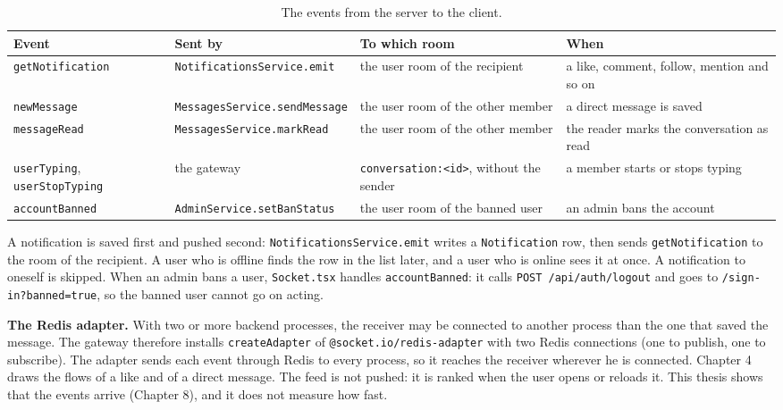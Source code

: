 \begin{table}[htb]
  \centering
  \caption{The events from the server to the client.}
  \label{tab:impl-events}
  \footnotesize
  \renewcommand{\arraystretch}{1.15}
  \begin{tabularx}{\textwidth}{@{}>{\raggedright\arraybackslash}p{3.1cm} >{\raggedright\arraybackslash}p{4.1cm} >{\raggedright\arraybackslash}p{3.4cm} >{\raggedright\arraybackslash}X@{}}
    \toprule
    Event & Sent by & To which room & When \\
    \midrule
    \texttt{getNotification} & \texttt{Notifications\allowbreak Service.emit} & the user room of the recipient & a like, comment, follow, mention and so on \\
    \texttt{newMessage} & \texttt{Messages\allowbreak Service.sendMessage} & the user room of the other member & a direct message is saved \\
    \texttt{messageRead} & \texttt{Messages\allowbreak Service.markRead} & the user room of the other member & the reader marks the conversation as read \\
    \texttt{userTyping}, \texttt{userStopTyping} & the gateway & \texttt{conversation:<id>}, without the sender & a member starts or stops typing \\
    \texttt{accountBanned} & \texttt{Admin\allowbreak Service.setBanStatus} & the user room of the banned user & an admin bans the account \\
    \bottomrule
  \end{tabularx}
\end{table}

A notification is saved first and pushed second: \texttt{NotificationsService.emit} writes a \texttt{Notification} row, then sends \texttt{getNotification} to the room of the recipient. A user who is offline finds the row in the list later, and a user who is online sees it at once. A notification to oneself is skipped. When an admin bans a user, \texttt{Socket.tsx} handles \texttt{accountBanned}: it calls \texttt{POST /api/auth/logout} and goes to \texttt{/sign-in?banned=true}, so the banned user cannot go on acting.

\textbf{The Redis adapter.} With two or more backend processes, the receiver may be connected to another process than the one that saved the message. The gateway therefore installs \texttt{createAdapter} of \texttt{@socket.io/\allowbreak redis-adapter} with two Redis connections (one to publish, one to subscribe). The adapter sends each event through Redis to every process, so it reaches the receiver wherever he is connected. Chapter 4 draws the flows of a like and of a direct message. The feed is not pushed: it is ranked when the user opens or reloads it. This thesis shows that the events arrive (Chapter 8), and it does not measure how fast.

